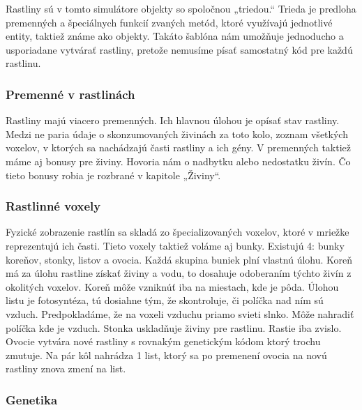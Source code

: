 \documentclass[12pt]{article}
\begin{document}
Rastliny sú v tomto simulátore objekty so spoločnou „triedou.“ Trieda je
predloha premenných a špeciálnych funkcií zvaných metód, ktoré využívajú
jednotlivé entity, taktiež známe ako objekty. Takáto šablóna nám umožňuje
jednoducho a usporiadane vytvárať rastliny, pretože nemusíme písať samostatný
kód pre každú rastlinu.

\subsubsection{Premenné v rastlinách}

Rastliny majú viacero premenných. Ich hlavnou úlohou je opísať stav rastliny.
Medzi ne paria údaje o skonzumovaných živinách za toto kolo, zoznam všetkých
voxelov, v ktorých sa nachádzajú časti rastliny a ich gény. V premenných
taktiež máme aj bonusy pre živiny. Hovoria nám o nadbytku alebo nedostatku
živín. Čo tieto bonusy robia je rozbrané v kapitole „Živiny“.

\subsubsection{Rastlinné voxely}

Fyzické zobrazenie rastlín sa skladá zo špecializovaných voxelov, ktoré
v mriežke reprezentujú ich časti. Tieto voxely taktiež voláme aj bunky.
Existujú 4: bunky koreňov, stonky, listov a ovocia. Každá skupina buniek plní
vlastnú úlohu. Koreň má za úlohu rastline získať živiny a vodu, to dosahuje
odoberaním týchto živín z okolitých voxelov. Koreň môže vzniknúť iba na
miestach, kde je pôda. Úlohou listu je fotosyntéza, tú dosiahne tým, že
skontroluje, či políčka nad ním sú vzduch. Predpokladáme, že na voxeli vzduchu
priamo svieti slnko. Môže nahradiť políčka kde je vzduch. Stonka uskladňuje
živiny pre rastlinu.  Rastie iba zvislo. Ovocie vytvára nové rastliny
s rovnakým genetickým kódom ktorý trochu zmutuje. Na pár kôl nahrádza 1 list,
ktorý sa po premenení ovocia na novú rastliny znova zmení na list.

\subsubsection{Genetika}
\end{document}
